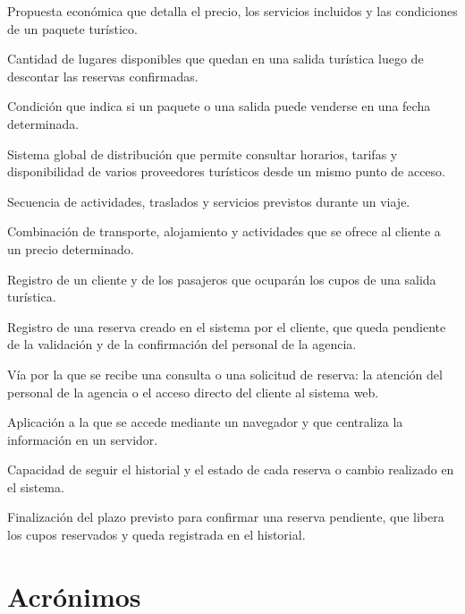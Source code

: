 
\begin{description}[style=nextline,leftmargin=1.27cm,labelindent=0pt,%
  labelsep=0.4em,font=\bfseries,itemsep=0.25\baselineskip]
  \item[Cotización] Propuesta económica que detalla el precio, los
        servicios incluidos y las condiciones de un paquete turístico.
  \item[Cupo] Cantidad de lugares disponibles que quedan en una salida
        turística luego de descontar las reservas confirmadas.
  \item[Disponibilidad] Condición que indica si un paquete o una salida
        puede venderse en una fecha determinada.
  \item[GDS] Sistema global de distribución que permite consultar
        horarios, tarifas y disponibilidad de varios proveedores
        turísticos desde un mismo punto de acceso.
  \item[Itinerario] Secuencia de actividades, traslados y servicios
        previstos durante un viaje.
  \item[Paquete turístico] Combinación de transporte, alojamiento y
        actividades que se ofrece al cliente a un precio determinado.
  \item[Reserva] Registro de un cliente y de los pasajeros que ocuparán
        los cupos de una salida turística.
  \item[Solicitud de reserva] Registro de una reserva creado en el sistema
        por el cliente, que queda pendiente de la validación y de la
        confirmación del personal de la agencia.
  \item[Canal de atención] Vía por la que se recibe una consulta o una
        solicitud de reserva: la atención del personal de la agencia o el
        acceso directo del cliente al sistema web.
  \item[Sistema web] Aplicación a la que se accede mediante un navegador
        y que centraliza la información en un servidor.
  \item[Trazabilidad] Capacidad de seguir el historial y el estado de
        cada reserva o cambio realizado en el sistema.
  \item[Vencimiento de una solicitud] Finalización del plazo previsto para
        confirmar una reserva pendiente, que libera los cupos reservados y
        queda registrada en el historial.
\end{description}

\section*{Acrónimos}

